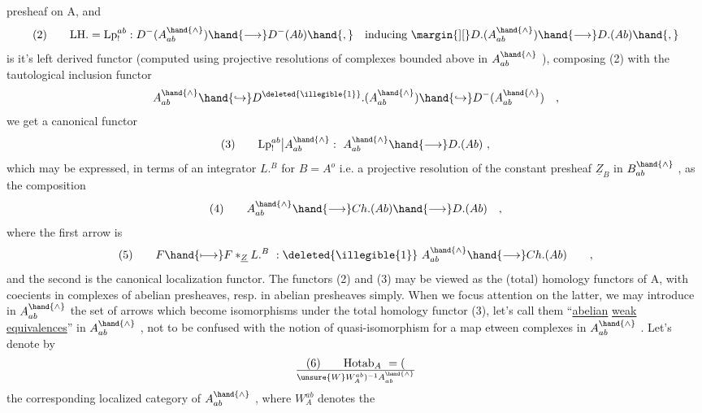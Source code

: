 
presheaf on A,  and
\[ \text{(2)}\qquad \mathrm{LH}. = \mathrm{Lp}_{!}^{ab} : D^{-}(A^{\hand{\wedge}}_{ab}) \hand{\longrightarrow} D^{-}(Ab) \hand{,} \quad \text{inducing}\ \margin{][} D.(A^{\hand{\wedge}}_{ab}) \hand{\longrightarrow} D.(Ab)\hand{,} \]
is it's left derived functor (computed using projective resolutions of
complexes bounded above in $A^{\hand{\wedge}}_{ab}$ ),  composing (2) with the tautological
inclusion functor
\[ A^{\hand{\wedge}}_{ab} \hand{\hookrightarrow} D^{\deleted{\illegible{1}}}.(A^{\hand{\wedge}}_{ab}) \hand{\hookrightarrow} D^{-}(A^{\hand{\wedge}}_{ab}) \quad , \]
we get a canonical functor
\[ \text{(3)}\qquad \mathrm{Lp}_{!}^{ab}\big| A^{\hand{\wedge}}_{ab} : \ A^{\hand{\wedge}}_{ab} \hand{\longrightarrow} D.(Ab) \ , \]
which may be expressed,  in terms of an integrator  $L.^{B}$  for  $B = A^{o}$\hand{,}
i.e. a projective resolution of the constant presheaf $\underline{Z}_B$  in $B^{\hand{\wedge}}_{ab}$ ,  as
the composition
\[ \text{(4)}\qquad A^{\hand{\wedge}}_{ab} \hand{\longrightarrow} Ch.(Ab) \hand{\longrightarrow} D.(Ab) \quad , \]
where the first arrow is
\[ \text{(5)}\qquad F \hand{\longmapsto} F *_{\underline{Z}} L.^{B} \ : \deleted{\illegible{1}}\ A^{\hand{\wedge}}_{ab} \hand{\longrightarrow} Ch.(Ab) \qquad , \]
and the second is the canonical localization functor.   The functors
(2) and (3) may be viewed as the (total) homology functors of A,  with
coecients in   complexes of abelian presheaves,  resp.
in abelian presheaves simply.  When we focus attention on the latter,
we may introduce in $A^{\hand{\wedge}}_{ab}$ the set of arrows which  become
isomorphisms under the  total homology functor (3),  let's call
them ``\uline{abelian} \uline{weak} \uline{equivalences}'' in $A^{\hand{\wedge}}_{ab}$ ,  not to be confused with the
notion of quasi-isomorphism for a map etween complexes in $A^{\hand{\wedge}}_{ab}$ .  Let's
denote by
\[ \text{(6)}\qquad \mathrm{Hotab}_A \ = (\over{\unsure{W}}{W}_A^{ab})^{-1} A^{\hand{\wedge}}_{ab} \]
the corresponding localized category of $A^{\hand{\wedge}}_{ab}$ ,  where  $W_A^{ab}$  denotes the
